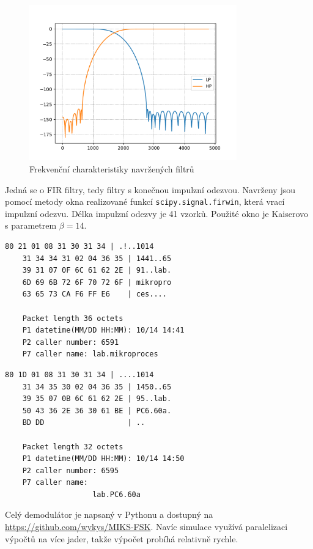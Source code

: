 \begin{figure}[H]
    \centering
    \includegraphics[width=0.8\textwidth]{img/filter.pdf}
    \caption{Frekvenční charakteristiky navržených filtrů}
\end{figure}

Jedná se o FIR filtry, tedy filtry s konečnou impulzní odezvou. Navrženy jsou pomocí metody okna realizované funkcí \texttt{scipy.signal.firwin}, která vrací impulzní odezvu. Délka impulzní odezvy je 41 vzorků. Použité okno je Kaiserovo s parametrem $\beta = 14$.

\begin{lstlisting}[caption={Dekódování zprávy ze souboru \texttt{1.wav}}]
    80 21 01 08 31 30 31 34 | .!..1014
    31 34 34 31 02 04 36 35 | 1441..65
    39 31 07 0F 6C 61 62 2E | 91..lab.
    6D 69 6B 72 6F 70 72 6F | mikropro
    63 65 73 CA F6 FF E6    | ces....

    Packet length 36 octets
    P1 datetime(MM/DD HH:MM): 10/14 14:41
    P2 caller number: 6591
    P7 caller name: lab.mikroproces
\end{lstlisting}

\begin{lstlisting}[caption={Dekódování zprávy ze souboru \texttt{3.wav}}]
    80 1D 01 08 31 30 31 34 | ....1014
    31 34 35 30 02 04 36 35 | 1450..65
    39 35 07 0B 6C 61 62 2E | 95..lab.
    50 43 36 2E 36 30 61 BE | PC6.60a.
    BD DD                   | ..

    Packet length 32 octets
    P1 datetime(MM/DD HH:MM): 10/14 14:50
    P2 caller number: 6595
    P7 caller name:
                    lab.PC6.60a
\end{lstlisting}

Celý demodulátor je napsaný v Pythonu a dostupný na \url{https://github.com/wykys/MIKS-FSK}. Navíc simulace využívá paralelizaci výpočtů na více jader, takže výpočet probíhá relativně rychle.